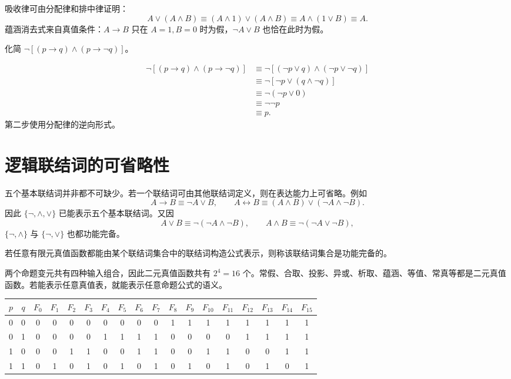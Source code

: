 吸收律可由分配律和排中律证明：
\[
A\lor(A\land B)\equiv(A\land1)\lor(A\land B)
\equiv A\land(1\lor B)\equiv A.
\]
蕴涵消去式来自真值条件：$A\to B$ 只在 $A=1,B=0$ 时为假，$\neg A\lor B$ 也恰在此时为假。

\begin{example}[title={等值演算证明}]\label{ch1-equiv-example}
化简 $\neg[(p\to q)\land(p\to\neg q)]$。
\begin{solution}
\[
\begin{aligned}
\neg[(p\to q)\land(p\to\neg q)]
&\equiv\neg[(\neg p\lor q)\land(\neg p\lor\neg q)]\\
&\equiv\neg[\neg p\lor(q\land\neg q)]\\
&\equiv\neg(\neg p\lor0)\\
&\equiv\neg\neg p\\
&\equiv p.
\end{aligned}
\]
第二步使用分配律的逆向形式。
\end{solution}
\end{example}

\section{逻辑联结词的可省略性}

五个基本联结词并非都不可缺少。若一个联结词可由其他联结词定义，则在表达能力上可省略。例如
\[
A\to B\equiv\neg A\lor B,\qquad
A\leftrightarrow B\equiv(A\land B)\lor(\neg A\land\neg B).
\]
因此 $\{\neg,\land,\lor\}$ 已能表示五个基本联结词。又因
\[
A\lor B\equiv\neg(\neg A\land\neg B),\qquad
A\land B\equiv\neg(\neg A\lor\neg B),
\]
$\{\neg,\land\}$ 与 $\{\neg,\lor\}$ 也都功能完备。

\begin{definition}[功能完备]\label{ch1-functionally-complete}
若任意有限元真值函数都能由某个联结词集合中的联结词构造公式表示，则称该联结词集合是功能完备的。
\end{definition}

两个命题变元共有四种输入组合，因此二元真值函数共有 $2^4=16$ 个。常假、合取、投影、异或、析取、蕴涵、等值、常真等都是二元真值函数。若能表示任意真值表，就能表示任意命题公式的语义。

\begin{center}\small
\begin{tabular}{cc|cccccccccccccccc}
\toprule
$p$ & $q$ & $F_0$&$F_1$&$F_2$&$F_3$&$F_4$&$F_5$&$F_6$&$F_7$&$F_8$&$F_9$&$F_{10}$&$F_{11}$&$F_{12}$&$F_{13}$&$F_{14}$&$F_{15}$\\
\midrule
0&0&0&0&0&0&0&0&0&0&1&1&1&1&1&1&1&1\\
0&1&0&0&0&0&1&1&1&1&0&0&0&0&1&1&1&1\\
1&0&0&0&1&1&0&0&1&1&0&0&1&1&0&0&1&1\\
1&1&0&1&0&1&0&1&0&1&0&1&0&1&0&1&0&1\\
\bottomrule
\end{tabular}
\end{center}

